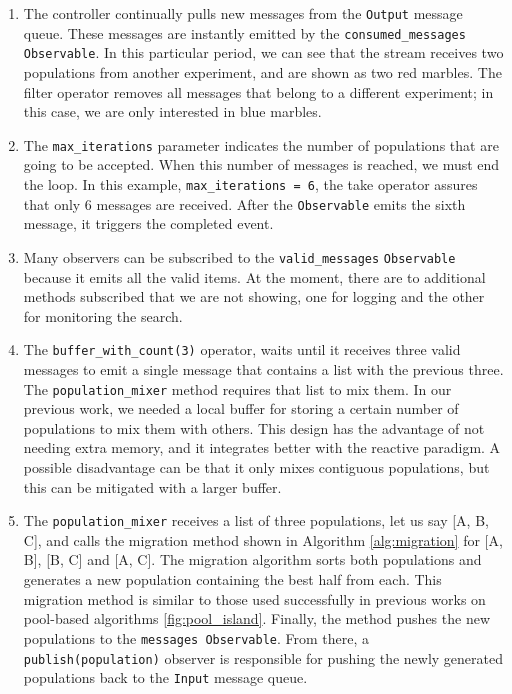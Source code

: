 \documentclass[review]{elsarticle}
\begin{document}
\begin{enumerate}
\item The controller continually pulls new messages from the \texttt{Output} 
message queue. These messages are instantly emitted by the  \texttt{consumed\_messages}
\texttt{Observable}. In this particular period, we can see that the stream receives 
two populations from another experiment, and are shown as two red marbles.  
The filter operator removes all messages that belong to a different experiment; 
in this case, we are only interested in blue marbles. 

\item The \texttt{max\_iterations} parameter indicates the number of populations that
are going to be accepted. When this number of messages is reached, we must
end the loop. In this example, \texttt{max\_iterations = 6},  the take operator 
assures that only 6 messages are received. After the \texttt{Observable} emits 
the sixth message, it triggers the completed event.

\item Many observers can be subscribed to the \texttt{valid\_messages} \texttt{Observable} because it
emits all the valid items. At the moment, there are to additional methods
subscribed that we are not showing, one for logging and the other for monitoring
the search.

\item The   \texttt{buffer\_with\_count(3)} operator, waits until it receives 
three valid messages to emit a single message that contains a list with
the previous three. The \texttt{population\_mixer}  method requires that list to mix them. 
In our previous work, we needed a local buffer for storing a certain 
number of populations to mix them with others. This design has the advantage
of not needing extra memory, and it integrates better with the reactive paradigm.
A possible disadvantage can be that it only mixes contiguous populations,
but this can be mitigated with a larger buffer.

\item The \texttt{population\_mixer} receives a list of three populations,
let us say [A, B, C], and calls the migration method shown in
Algorithm \ref{alg:migration}  for [A, B], [B, C] and [A, C]. 
The migration algorithm sorts both populations and generates
a new population containing the best half from each.
This migration method is similar to those used successfully in previous 
works on pool-based algorithms \ref{fig:pool_island}.  
Finally, the method pushes the new populations to the 
\texttt{messages Observable}. From there, a
\texttt{publish(population)} observer is responsible for pushing
the newly generated populations back to the \texttt{Input} message queue.
\end{enumerate}
\end{document}
